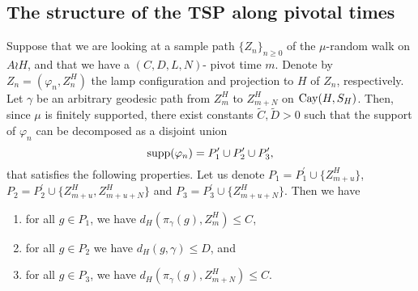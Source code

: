 \subsection{The structure of the TSP along pivotal times}

	Suppose that we are looking at a sample path $\{Z_n\}_{n\ge 0}$ of the $\mu$-random walk on $A\wr H$, and that we have a $(C,D,L,N)$- pivot time $m$. Denote by $Z_n=(\varphi_n,Z_n^H)$ the lamp configuration and projection to $H$ of $Z_n$, respectively. Let  $\gamma$ be an arbitrary geodesic path from $Z_m^{H}$ to $Z^{H}_{m+N}$ on $\mathrm{Cay}(H,S_H)$. Then, since $\mu$ is finitely supported, there exist constants $\widetilde{C},\widetilde{D}>0$ such that the support of $\varphi_n$ can be decomposed as a disjoint union \[\mathrm{supp}(\varphi_n)=P^{\prime}_1\cup P^{\prime}_2\cup P^{\prime}_3,\]
that satisfies the following properties. Let us denote $P_1=P^{\prime}_1\cup\{Z^{H}_{m+u}\}$, $P_2=P^{\prime}_2\cup \{Z^{H}_{m+u}, Z^{H}_{m+u+N}\}$ and  $P_3=P^{\prime}_3\cup \{Z^{H}_{m+u+N}\}$. Then we have
\begin{enumerate}
	\item for all $g\in P_1$, we have $d_H\left( \pi_{\gamma}(g) ,Z_m^H  \right)\le C$,
	\item for all $g\in P_2$ we have $d_H(g,\gamma)\le D$, and
	\item for all $g\in P_3$, we have $d_H\left( \pi_{\gamma}(g),Z^H_{m+N} \right)\le C$.
\end{enumerate}



